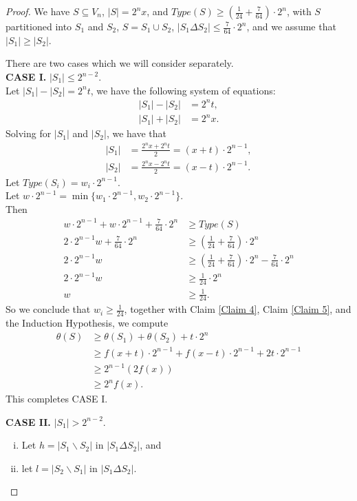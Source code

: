 \documentclass[12pt]{ucthesis}
\theoremstyle{plain}
\theoremstyle{definition}
\begin{document}
\begin{proof}
We have $S \subseteq V_n$, $|S| = 2^n x$,
and $Type(S) \ge (\frac{1}{24} + \frac{7}{64}) \cdot 2^n$,
with $S$ partitioned into $S_1$ and $S_2$, $S = S_1 \cup S_2$,
$|S_1 \Delta S_2| \le \frac{7}{64} \cdot 2^n$,
and we assume that $|S_1| \ge |S_2|$.

There are two cases which we will consider separately. \\
\textbf{CASE I.} $|S_1| \le 2^{n - 2}$. \\
Let $|S_1| - |S_2| = 2^n t$, we have the following system of equations:
\begin{align*}
|S_1| - |S_2| & = 2^n t, \\
|S_1| + |S_2| & = 2^n x.
\end{align*}
Solving for $|S_1|$ and $|S_2|$, we have that
\begin{align*}
|S_1| & = \frac{2^n x + 2^n t}{2} = (x + t) \cdot 2^{n - 1}, \\
|S_2| & = \frac{2^n x - 2^n t}{2} = (x - t) \cdot 2^{n - 1}.
\end{align*}
Let $Type(S_i) = w_i \cdot 2^{n - 1}$. \\
Let $w \cdot 2^{n - 1} = \min\{w_1 \cdot 2^{n - 1}, w_2 \cdot 2^{n - 1}\}$. \\
Then
\begin{align*}
w \cdot 2^{n - 1} + w \cdot 2^{n - 1} + \frac{7}{64} \cdot 2^n & \ge Type(S) \\
2 \cdot 2^{n - 1} w + \frac{7}{64} \cdot 2^n & \ge (\frac{1}{24} + \frac{7}{64}) \cdot 2^n \\
2 \cdot 2^{n - 1} w & \ge (\frac{1}{24} + \frac{7}{64}) \cdot 2^n - \frac{7}{64} \cdot 2^n \\
2 \cdot 2^{n - 1} w & \ge \frac{1}{24} \cdot 2^n \\
w & \ge \frac{1}{24}.
\end{align*}
So we conclude that $w_i \ge \frac{1}{24}$,
together with Claim \ref{Claim 4}, Claim \ref{Claim 5},
and the Induction Hypothesis, we compute
\begin{align*}
\theta(S)
& \ge \theta(S_1) + \theta(S_2) + t \cdot 2^n \\
& \ge f(x + t) \cdot 2^{n - 1} + f(x - t) \cdot 2^{n - 1} + 2 t \cdot 2^{n - 1} \\
& \ge 2^{n - 1} (2 f(x)) \\
& \ge 2^n f(x).
\end{align*}
This completes CASE I.

\textbf{CASE II.} $|S_1| > 2^{n - 2}$.
\begin{enumerate}[(i)]
\item Let $h = |S_1 \backslash S_2|$ in $|S_1 \Delta S_2|$, and
\item let $l = |S_2 \backslash S_1|$ in $|S_1 \Delta S_2|$.
\end{enumerate}


\end{proof}
\end{document}
